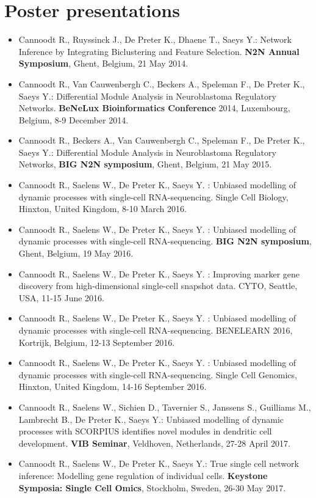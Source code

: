 \section{Poster presentations}

\begin{itemize}
  \item Cannoodt R., Ruyssinck J., De Preter K., Dhaene T., Saeys Y.: Network Inference by Integrating Biclustering and Feature Selection. \textbf{N2N Annual Symposium}, Ghent, Belgium, 21 May 2014.
  \item Cannoodt R., Van Cauwenbergh C., Beckers A., Speleman F., De Preter K., Saeys Y.: Differential Module Analysis in Neuroblastoma Regulatory Networks. \textbf{BeNeLux Bioinformatics Conference} 2014, Luxembourg, Belgium, 8-9 December 2014.
  \item Cannoodt R., Beckers A., Van Cauwenbergh C., Speleman F., De Preter K., Saeys Y.: Differential Module Analysis in Neuroblastoma Regulatory Networks, \textbf{BIG N2N symposium}, Ghent, Belgium, 21 May 2015.
  \item Cannoodt R., Saelens W., De Preter K., Saeys Y. : Unbiased modelling of dynamic processes with single-cell RNA-sequencing. Single Cell Biology, Hinxton, United Kingdom, 8-10 March 2016.
  \item Cannoodt R., Saelens W., De Preter K., Saeys Y. : Unbiased modelling of dynamic processes with single-cell RNA-sequencing. \textbf{BIG N2N symposium}, Ghent, Belgium, 19 May 2016.
  \item Cannoodt R., Saelens W., De Preter K., Saeys Y. : Improving marker gene discovery from high-dimensional single-cell snapshot data. CYTO, Seattle, USA, 11-15 June 2016.
  \item Cannoodt R., Saelens W., De Preter K., Saeys Y. : Unbiased modelling of dynamic processes with single-cell RNA-sequencing. BENELEARN 2016, Kortrijk, Belgium, 12-13 September 2016.
  \item Cannoodt R., Saelens W., De Preter K., Saeys Y. : Unbiased modelling of dynamic processes with single-cell RNA-sequencing. Single Cell Genomics, Hinxton, United Kingdom, 14-16 September 2016.
  \item Cannoodt R., Saelens W., Sichien D., Tavernier S., Janssens S., Guilliams M., Lambrecht B., De Preter K., Saeys Y.: Unbiased modelling of dynamic processes with SCORPIUS identifies novel modules in dendritic cell development. \textbf{VIB Seminar}, Veldhoven, Netherlands, 27-28 April 2017.
  \item Cannoodt R., Saelens W., De Preter K., Saeys Y.: True single cell network inference: Modelling gene regulation of individual cells. \textbf{Keystone Symposia: Single Cell Omics}, Stockholm, Sweden, 26-30 May 2017. 

\end{itemize}
